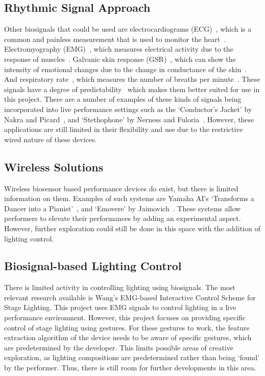 \subsection{Rhythmic Signal Approach}
Other biosignals that could be used are electrocardiograms (ECG)~\cite{Afonso:1999}\cite{Pan:1985},
which is a common and painless measurement that is used to monitor the heart~\cite{Mayo:2023}.
Electromyography (EMG)~\cite{Tanaka:2002}\cite{Young:2013},
which measures electrical activity due to the response of muscles~\cite{Hopkins:2023}.
Galvanic skin response (GSR)~\cite{Kurniawan:2013},
which can show the intensity of emotional changes due to the change in conductance of the skin~\cite{Farnsworth:2018}.
And respiratory rate~\cite{Carlos:2011},
which measures the number of breaths per minute~\cite{Hopkins2:2023}.
These signals have a degree of predictability~\cite{Tahiroğlu:2008} which makes them better suited for use in this project.
There are a number of examples of these kinds of signals being incorporated into live performance settings such as
the `Conductor's Jacket' by Nakra and Picard~\cite{Nakra:1998}, and `Stethophone' by Nerness and Fuloria~\cite{Nerness:2019}.
However, these applications are still limited in their flexibility and use due to the restrictive wired nature of these devices.

\subsection{Wireless Solutions}
Wireless biosensor based performance devices do exist, but there is limited information on them.
Examples of such systems are Yamaha AI's `Transforms a Dancer into a Pianist'~\cite{Yamaha:2018}, and `Emovere' by Jaimovich~\cite{Jaimovich:2016}.
These systems allow performers to elevate their performances by adding an experimental aspect.
However, further exploration could still be done in this space with the addition of lighting control.

\subsection{Biosignal-based Lighting Control}
There is limited activity in controlling lighting using biosignals.
The most relevant research available is Wang's EMG-based Interactive Control Scheme for Stage Lighting\cite{Wang:2022}.
This project uses EMG signals to control lighting in a live performance environment.
However, this project focuses on providing specific control of stage lighting using gestures.
For these gestures to work, the feature extraction algorithm of the device needs to be aware of specific gestures, which are predetermined by the developer.
This limits possible areas of creative exploration, as lighting compositions are predetermined rather than being `found' by the performer.
Thus, there is still room for further developments in this area.

